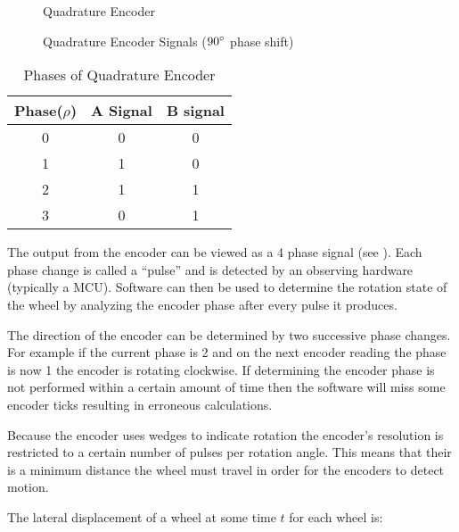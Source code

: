 \documentclass[main.tex]{subfiles}
\begin{document}
\begin{figure}[h]
	\begin{center}
	
	\end{center}
	\caption{Quadrature Encoder}
	\label{fig:quadEncode}
\end{figure}

\begin{figure}[h]
	\begin{center}
	
	\end{center}
	\caption{Quadrature Encoder Signals ($90^\circ$ phase shift)}
	\label{fig:encSig}
\end{figure}

\begin{table}[h]
	\begin{center}
	\begin{tabularx}{.35\textwidth}{ccc}
		\toprule
		Phase($\rho$) & A Signal & B signal\\
		\midrule
		0 & 0 & 0 \\
		1 & 1 & 0 \\
		2 & 1 & 1 \\
		3 & 0 & 1 \\
		\bottomrule
		\end{tabularx}
		\caption{Phases of Quadrature Encoder}
		\label{tab:phaseTab}
	\end{center}
\end{table}

The output from the encoder can be viewed as a 4 phase signal (see
). Each phase change is called a ``pulse'' and is detected by
an observing hardware (typically a MCU). Software can then be used to determine
the rotation state of the wheel by analyzing the encoder phase after every pulse
it produces\cite{wikiEncod}.

The direction of the encoder can be determined by two successive phase changes.
For example if the current phase is 2 and on the next encoder reading the phase
is now 1 the encoder is rotating clockwise. If determining the encoder phase is
not performed within a certain amount of time then the software will miss some
encoder ticks resulting in erroneous calculations. 

Because the encoder uses wedges to indicate rotation the encoder's resolution is
restricted to a certain number of pulses per rotation angle. This means that
their is a minimum distance the wheel must travel in order for the encoders to
detect motion.

The lateral displacement of a wheel at some time $t$ for each wheel is: 
\end{document}
